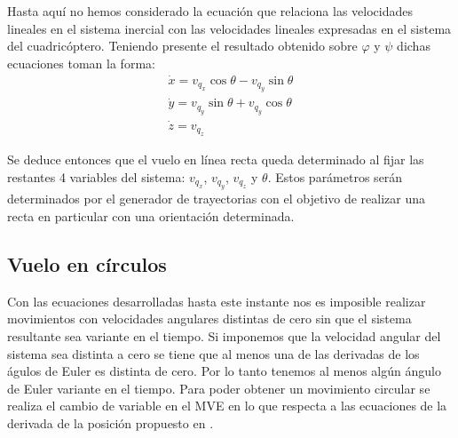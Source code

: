 \documentclass[main]{subfiles}
\begin{document}
Hasta aqu\'i no hemos considerado la ecuaci\'on que relaciona las velocidades lineales en el sistema inercial con las velocidades lineales expresadas en el sistema del cuadric\'optero. Teniendo presente el resultado obtenido sobre $\varphi$ y $\psi$ dichas ecuaciones toman la forma:
\begin{equation}\begin{array}{c}
\dot{x}=v_{q_x}\cos\theta-v_{q_y}\sin\theta\\
\dot{y}=v_{q_y}\sin\theta+v_{q_y}\cos\theta\\
\dot{z}=v_{q_z}
\end{array}
\end{equation} 

Se deduce entonces que el vuelo en l\'inea recta queda determinado al fijar las restantes 4 variables del sistema: $v_{q_x}$, $v_{q_y}$, $v_{q_z}$ y $\theta$. Estos par\'ametros ser\'an determinados por el generador de trayectorias con el objetivo de realizar una recta en particular con una orientaci\'on determinada. 

\subsection{Vuelo en c\'irculos}

Con las ecuaciones desarrolladas hasta este instante nos es imposible realizar movimientos con velocidades angulares distintas de cero sin que el sistema resultante sea variante en el tiempo. Si imponemos que la velocidad angular del sistema sea distinta a cero se tiene que al menos una de las derivadas de los \'agulos de Euler es distinta de cero. Por lo tanto tenemos al menos alg\'un \'angulo de Euler variante en el tiempo. Para poder obtener un movimiento circular se realiza el cambio de variable en el MVE en lo que respecta a las ecuaciones de la derivada de la posici\'on propuesto en \cite{bib:auion}. \\
\end{document}
